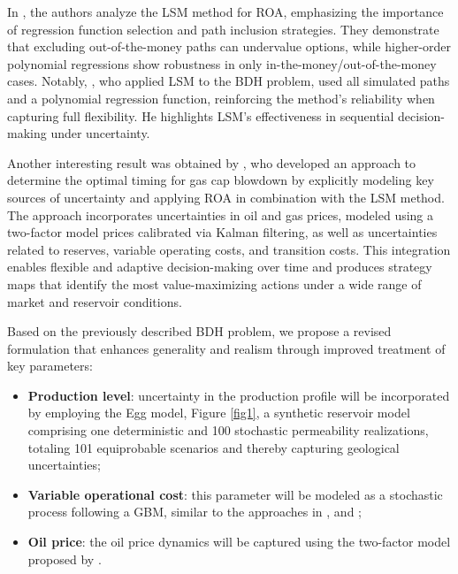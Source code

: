 \documentclass[pdflatex,sn-basic]{sn-jnl}%
\theoremstyle{thmstyleone}%
\theoremstyle{thmstyletwo}%
\theoremstyle{thmstylethree}%
\begin{document}
In \cite{ref15}, the authors analyze the LSM method for ROA, emphasizing the importance of regression function selection and path inclusion strategies. They demonstrate that excluding out-of-the-money paths can undervalue options, while higher-order polynomial regressions show robustness in only in-the-money/out-of-the-money cases. Notably, \cite{ref13}, who applied LSM to the BDH problem, used all simulated paths and a polynomial regression function, reinforcing the method's reliability when capturing full flexibility. He highlights LSM's effectiveness in sequential decision-making under uncertainty.

Another interesting result was obtained by \cite{ref16}, who developed an approach to determine the optimal timing for gas cap blowdown by explicitly modeling key sources of uncertainty and applying ROA in combination with the LSM method. The approach incorporates uncertainties in oil and gas prices, modeled using a two-factor model prices \citep{ref17} calibrated via Kalman filtering, as well as uncertainties related to reserves, variable operating costs, and transition costs. This integration enables flexible and adaptive decision-making over time and produces strategy maps that identify the most value-maximizing actions under a wide range of market and reservoir conditions. 

Based on the previously described BDH problem, we propose a revised formulation that enhances generality and realism through improved treatment of key parameters:
\begin{itemize}
    \item \textbf{Production level}: uncertainty in the production profile will be incorporated by employing the Egg model, Figure \ref{fig1}, a synthetic reservoir model comprising one deterministic and 100 stochastic permeability realizations, totaling 101 equiprobable scenarios \citep{ref18} and thereby capturing geological uncertainties;
    \item \textbf{Variable operational cost}: this parameter will be modeled as a stochastic process following a GBM, similar to the approaches in \cite{ref19}, \cite{ref20} and \cite{ref21};
    \item \textbf{Oil price}: the oil price dynamics will be captured using the two-factor model proposed by \cite{ref17}.
\end{itemize}
\end{document}
